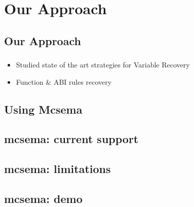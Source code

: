 \documentclass[mathserif,10pt]{beamer}
\begin{document}
\section{Our Approach}
  \subsection*{Our Approach}
  \frame
  {
    \frametitle{\subsecname}
    \begin{itemize}
      \item Studied state of the art strategies for Variable Recovery
      \item Function \& ABI rules recovery 
    \end{itemize}

  }

  \subsection{Using Mcsema}
  \frame
  {
    \frametitle{\subsecname}
  }

  \subsection{mcsema: current support}
  \frame
  {
    \frametitle{\subsecname}
  }

  \subsection{mcsema: limitations}
  \frame
  {
    \frametitle{\subsecname}
  }


  \subsection{mcsema: demo}
  \frame
  {
    \frametitle{\subsecname}
  }
\end{document}

